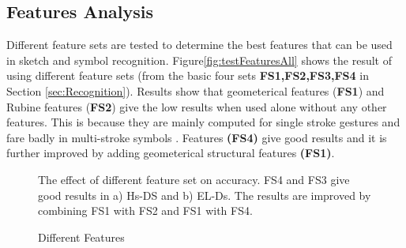 \documentclass[preprint,10pt,5p,twocolumn]{elsarticle}
\begin{document}
 \subsection{Features Analysis}
\label{sec:featexp}
Different feature sets are tested to determine the best features that can be used in sketch and symbol recognition. Figure\ref{fig:testFeaturesAll} shows the result of using different feature sets (from the basic four sets \textbf{FS1,FS2,FS3,FS4} in Section \ref{sec:Recognition}). Results show that geometerical features (\textbf{FS1}) and Rubine features (\textbf{FS2}) \cite{gestureexample12} give the low results when used alone without any other features. This is because they are mainly computed for single stroke gestures and fare badly in multi-stroke symbols \cite{compareFeaturSVM}. Features \textbf{(FS4)} give good results and it is further improved by adding geometerical structural features \textbf{(FS1)}.

 \begin{figure}
	\centering
	\caption{Different Features} The effect of different feature set on accuracy.  FS4 and FS3 give good results in a) Hs-DS and b) EL-Ds. The results are improved by combining FS1 with FS2 and FS1 with FS4.    %
\end{figure}  
\end{document}
